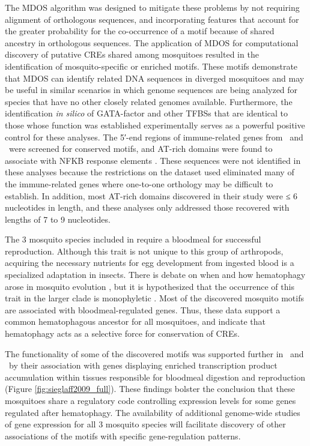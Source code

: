 The \gls{MDOS} algorithm \cite{Wu2008} was designed to mitigate these problems by not requiring alignment of orthologous sequences, and incorporating features that account for the greater probability for the co-occurrence of a motif because of shared ancestry in orthologous sequences. The application of \gls{MDOS} for computational discovery of putative \glspl{CRE} shared among mosquitoes resulted in the identification of mosquito-specific or enriched motifs. These motifs demonstrate that \gls{MDOS} can identify related DNA sequences in diverged mosquitoes and may be useful in similar scenarios in which genome sequences are being analyzed for species that have no other closely related genomes available. Furthermore, the identification \textit{in silico} of GATA-factor and other \glspl{TFBS} that are identical to those whose function was established experimentally \cite{Kokoza2001,Cho2006,Attardo2003,Ahmed1999,Pham2005,Giannoni2001,Dittmer2003,Meredith2006} serves as a powerful positive control for these analyses. The 5′-end regions of immune-related genes from \Ag\ and \Dm\ were screened for conserved motifs, and AT-rich domains were found to associate with \gls{NFKB} response elements \cite{Hernandez-Romano2008}. These sequences were not identified in these analyses because the restrictions on the dataset used eliminated many of the immune-related genes where one-to-one orthology may be difficult to establish. In addition, most AT-rich domains discovered in their study were ≤ 6 nucleotides in length, and these analyses only addressed those recovered with lengths of 7 to 9 nucleotides.

The 3 mosquito species included in \citet{Sieglaff2009} require a bloodmeal for successful reproduction. Although this trait is not unique to this group of arthropods, acquiring the necessary nutrients for egg development from ingested blood is a specialized adaptation in insects. There is debate on when and how \gls{hematophagy} arose in mosquito evolution \cite{Rai1999a}, but it is hypothesized that the occurrence of this trait in the larger clade is \gls{monophyletic} \cite{Borkent2004,Calvo2006}. Most of the discovered mosquito motifs are associated with bloodmeal-regulated genes. Thus, these data support a common hematophagous ancestor for all mosquitoes, and indicate that \gls{hematophagy} acts as a selective force for conservation of \glspl{CRE}.

The functionality of some of the discovered motifs was supported further in \Ag\ and \Aa\ by their association with genes displaying enriched transcription product accumulation within tissues responsible for bloodmeal digestion and reproduction (Figure \ref{fig:sieglaff2009_full}). These findings bolster the conclusion that these mosquitoes share a regulatory code controlling expression levels for some genes regulated after \gls{hematophagy}. The availability of additional genome-wide studies of gene expression for all 3 mosquito species will facilitate discovery of other associations of the motifs with specific gene-regulation patterns.

